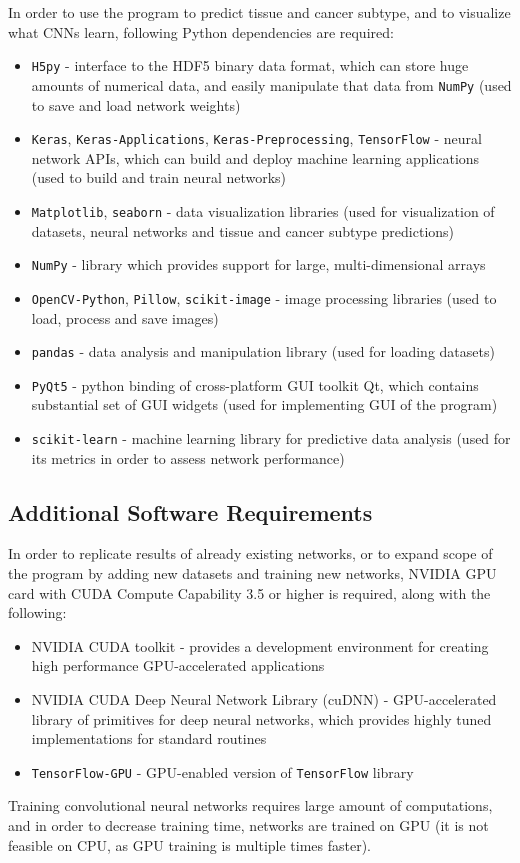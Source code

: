 In order to use the program to predict tissue and cancer subtype, and to visualize what CNNs learn, following Python dependencies are required: 
\begin{itemize}
	\itemsep 0em
	\item \texttt{H5py} - interface to the HDF5 binary data format, which can store huge amounts of numerical data, and easily manipulate that data from \texttt{NumPy} (used to save and load network weights)
	\item \texttt{Keras}, \texttt{Keras-Applications}, \texttt{Keras-Preprocessing}, \texttt{TensorFlow} - neural network APIs, which can build and deploy machine learning applications (used to build and train neural networks)
	\item \texttt{Matplotlib}, \texttt{seaborn} - data visualization libraries (used for visualization of datasets, neural networks and tissue and cancer subtype predictions)
	\item \texttt{NumPy} - library which provides support for large, multi-dimensional arrays
	\item \texttt{OpenCV-Python}, \texttt{Pillow}, \texttt{scikit-image} - image processing libraries (used to load, process and save images)
	\item \texttt{pandas} - data analysis and manipulation library (used for loading datasets)
	\item \texttt{PyQt5} - python binding of cross-platform GUI toolkit Qt, which contains substantial set of GUI widgets (used for implementing GUI of the program)
	\item \texttt{scikit-learn} - machine learning library for predictive data analysis (used for its metrics in order to assess network performance)
\end{itemize}

\subsection{Additional Software Requirements}

In order to replicate results of already existing networks, or to expand scope of the program by adding new datasets and training new networks, NVIDIA GPU card with CUDA Compute Capability 3.5 or higher is required, along with the following:
\begin{itemize}
	\itemsep 0em
	\item NVIDIA CUDA toolkit - provides a development environment for creating high performance GPU-accelerated applications
	\item NVIDIA CUDA Deep Neural Network Library (cuDNN) - GPU-accelerated library of primitives for deep neural networks, which provides highly tuned implementations for standard routines
	\item \texttt{TensorFlow-GPU} - GPU-enabled version of \texttt{TensorFlow} library
\end{itemize}
Training convolutional neural networks requires large amount of computations, and in order to decrease training time, networks are trained on GPU (it is not feasible on CPU, as GPU training is multiple times faster).

